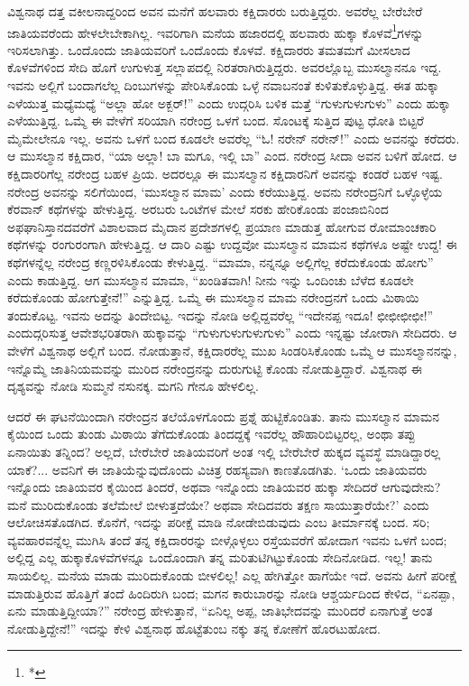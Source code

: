 ವಿಶ್ವನಾಥ ದತ್ತ ವಕೀಲನಾದ್ದರಿಂದ ಅವನ ಮನೆಗೆ ಹಲವಾರು ಕಕ್ಷಿದಾರರು ಬರುತ್ತಿದ್ದರು. ಅವರೆಲ್ಲ ಬೇರೆಬೇರೆ ಜಾತಿಯವರೆಂದು ಹೇಳಲೇಬೇಕಾಗಿಲ್ಲ. ಇವರಿಗಾಗಿ ಮನೆಯ ಹಜಾರದಲ್ಲಿ ಹಲವಾರು ಹುಕ್ಕಾ ಕೊಳವೆ\footnote{*}ಗಳನ್ನು ಇರಿಸಲಾಗಿತ್ತು. ಒಂದೊಂದು ಜಾತಿಯವರಿಗೆ ಒಂದೊಂದು ಕೊಳವೆ. ಕಕ್ಷಿದಾರರು ತಮತಮಗೆ ಮೀಸಲಾದ ಕೊಳವೆಗಳಿಂದ ಸೇದಿ ಹೊಗೆ ಉಗುಳುತ್ತ ಸಲ್ಲಾಪದಲ್ಲಿ ನಿರತರಾಗಿರುತ್ತಿದ್ದರು. ಅವರಲ್ಲೊಬ್ಬ ಮುಸಲ್ಮಾನನೂ ಇದ್ದ. ಇವನು ಅಲ್ಲಿಗೆ ಬಂದಾಗಲೆಲ್ಲ ದಿಂಬುಗಳನ್ನು ಪೇರಿಸಿಕೊಂಡು ಒಳ್ಳೆ ನವಾಬನಂತೆ ಕುಳಿತುಕೊಳ್ಳುತ್ತಿದ್ದ. ಈತ ಹುಕ್ಕಾ ಎಳೆಯುತ್ತ ಮಧ್ಯೆಮಧ್ಯೆ “ಅಲ್ಲಾ ಹೋ ಅಕ್ಬರ್!” ಎಂದು ಉದ್ಗರಿಸಿ ಬಳಿಕ ಮತ್ತೆ “ಗುಳುಗುಳುಗುಳು” ಎಂದು ಹುಕ್ಕಾ ಎಳೆಯುತ್ತಿದ್ದ. ಒಮ್ಮೆ ಈ ವೇಳೆಗೆ ಸರಿಯಾಗಿ ನರೇಂದ್ರ ಒಳಗೆ ಬಂದ. ಸೊಂಟಕ್ಕೆ ಸುತ್ತಿದ ಪುಟ್ಟ ಧೋತಿ ಬಿಟ್ಟರೆ ಮೈಮೇಲೇನೂ ಇಲ್ಲ. ಅವನು ಒಳಗೆ ಬಂದ ಕೂಡಲೇ ಅವರೆಲ್ಲ “ಓ! ನರೇನ್ ನರೇನ್!” ಎಂದು ಅವನನ್ನು ಕರೆದರು. ಆ ಮುಸಲ್ಮಾನ ಕಕ್ಷಿದಾರ, “ಯಾ ಅಲ್ಲಾ! ಬಾ ಮಗೂ, ಇಲ್ಲಿ ಬಾ” ಎಂದ. ನರೇಂದ್ರ ಸೀದಾ ಅವನ ಬಳಿಗೆ ಹೋದ. ಆ ಕಕ್ಷಿದಾರರಿಗೆಲ್ಲ ನರೇಂದ್ರ ಬಹಳ ಪ್ರಿಯ. ಅದರಲ್ಲೂ ಈ ಮುಸಲ್ಮಾನ ಕಕ್ಷಿದಾರನಿಗೆ ಅವನನ್ನು ಕಂಡರೆ ಬಹಳ ಇಷ್ಟ. ನರೇಂದ್ರ ಅವನನ್ನು ಸಲಿಗೆಯಿಂದ, ‘ಮುಸಲ್ಮಾನ ಮಾಮ’ ಎಂದು ಕರೆಯುತ್ತಿದ್ದ. ಅವನು ನರೇಂದ್ರನಿಗೆ ಒಳ್ಳೊಳ್ಳೆಯ ಕೆರವಾನ್ ಕಥೆಗಳನ್ನು ಹೇಳುತ್ತಿದ್ದ. ಅರಬರು ಒಂಟೆಗಳ ಮೇಲೆ ಸರಕು ಹೇರಿಕೊಂಡು ಪಂಜಾಬಿನಿಂದ ಅಫಘಾನಿಸ್ತಾನದವರೆಗೆ ವಿಶಾಲವಾದ ಮೈದಾನ ಪ್ರದೇಶಗಳಲ್ಲಿ ಪ್ರಯಾಣ ಮಾಡುತ್ತ ಹೋಗುವ ರೋಮಾಂಚಕಾರಿ ಕಥೆಗಳನ್ನು ರಂಗುರಂಗಾಗಿ ಹೇಳುತ್ತಿದ್ದ. ಆ ದಾರಿ ಎಷ್ಟು ಉದ್ದವೋ ಮುಸಲ್ಮಾನ ಮಾಮನ ಕಥೆಗಳೂ ಅಷ್ಟೇ ಉದ್ದ! ಈ ಕಥೆಗಳನ್ನೆಲ್ಲ ನರೇಂದ್ರ ಕಣ್ಣರಳಿಸಿಕೊಂಡು ಕೇಳುತ್ತಿದ್ದ. “ಮಾಮಾ, ನನ್ನನ್ನೂ ಅಲ್ಲಿಗೆಲ್ಲ ಕರೆದುಕೊಂಡು ಹೋಗು” ಎಂದು ಕಾಡುತ್ತಿದ್ದ. ಆಗ ಮುಸಲ್ಮಾನ ಮಾಮಾ, “ಖಂಡಿತವಾಗಿ! ನೀನು ಇನ್ನು ಒಂದಿಂಚು ಬೆಳೆದ ಕೂಡಲೇ ಕರೆದುಕೊಂಡು ಹೋಗುತ್ತೇನೆ!” ಎನ್ನುತ್ತಿದ್ದ. ಒಮ್ಮೆ ಈ ಮುಸಲ್ಮಾನ ಮಾಮ ನರೇಂದ್ರನಗೆ ಒಂದು ಮಿಠಾಯಿ ತಂದುಕೊಟ್ಟ. ಇವನು ಅದನ್ನು ತಿಂದೇಬಿಟ್ಟ. ಇದನ್ನು ನೋಡಿ ಅಲ್ಲಿದ್ದವರೆಲ್ಲ “ಇದೇನಪ್ಪ ಇದೂ! ಛೀಛೀಛೀಛೀ!” ಎಂದುದ್ಗರಿಸುತ್ತ ಆವೇಶಭರಿತರಾಗಿ ಹುಕ್ಕಾವನ್ನು “ಗುಳುಗುಳುಗುಳುಗುಳು” ಎಂದು ಇನ್ನಷ್ಟು ಜೋರಾಗಿ ಸೇದಿದರು. ಆ ವೇಳೆಗೆ ವಿಶ್ವನಾಥ ಅಲ್ಲಿಗೆ ಬಂದ. ನೋಡುತ್ತಾನೆ, ಕಕ್ಷಿದಾರರೆಲ್ಲ ಮುಖ ಸಿಂಡರಿಸಿಕೊಂಡು ಒಮ್ಮೆ ಆ ಮುಸಲ್ಮಾನನನ್ನು, ಇನ್ನೊಮ್ಮೆ ಜಾತಿನಿಯಮವನ್ನು ಮುರಿದ ನರೇಂದ್ರನನ್ನು ದುರುಗುಟ್ಟಿ ಕೊಂಡು ನೋಡುತ್ತಿದ್ದಾರೆ. ವಿಶ್ವನಾಥ ಈ ದೃಶ್ಯವನ್ನು ನೋಡಿ ಸುಮ್ಮನೆ ನಸುನಕ್ಕ. ಮಗನಿ ಗೇನೂ ಹೇಳಲಿಲ್ಲ.

ಆದರೆ ಈ ಘಟನೆಯಿಂದಾಗಿ ನರೇಂದ್ರನ ತಲೆಯೊಳಗೊಂದು ಪ್ರಶ್ನೆ ಹುಟ್ಟಿಕೊಂಡಿತು. ತಾನು ಮುಸಲ್ಮಾನ ಮಾಮನ ಕೈಯಿಂದ ಒಂದು ತುಂಡು ಮಿಠಾಯಿ ತೆಗೆದುಕೊಂಡು ತಿಂದದ್ದಕ್ಕೆ ಇವರೆಲ್ಲ ಹೌಹಾರಿಬಿಟ್ಟರಲ್ಲ, ಅಂಥಾ ತಪ್ಪು ಏನಾಯಿತು ತನ್ನಿಂದ? ಅಲ್ಲದೆ, ಬೇರೆಬೇರೆ ಜಾತಿಯವರಿಗೆ ಅಂತ ಇಲ್ಲಿ ಬೇರೆಬೇರೆ ಹುಕ್ಕದ ವ್ಯವಸ್ಥೆ ಮಾಡಿದ್ದಾರಲ್ಲ ಯಾಕೆ?... ಅವನಿಗೆ ಈ ಜಾತಿಯೆನ್ನುವುದೊಂದು ವಿಚಿತ್ರ ರಹಸ್ಯವಾಗಿ ಕಾಣತೊಡಗಿತು. ‘ಒಂದು ಜಾತಿಯವರು ಇನ್ನೊಂದು ಜಾತಿಯವರ ಕೈಯಿಂದ ತಿಂದರೆ, ಅಥವಾ ಇನ್ನೊಂದು ಜಾತಿಯವರ ಹುಕ್ಕಾ ಸೇದಿದರೆ ಆಗುವುದೇನು? ಮನೆ ಮುರಿದುಕೊಂಡು ತಲೆಮೇಲೆ ಬೀಳುತ್ತದೆಯೇ? ಅಥವಾ ಸೇದಿದವರು ತಕ್ಷಣ ಸಾಯುತ್ತಾರೆಯೇ?’ ಎಂದು ಆಲೋಚಿಸತೊಡಗಿದ. ಕೊನೆಗೆ, ಇದನ್ನು ಪರೀಕ್ಷೆ ಮಾಡಿ ನೋಡೇಬಿಡುವುದು ಎಂಬ ತೀರ್ಮಾನಕ್ಕೆ ಬಂದ. ಸರಿ; ವ್ಯವಹಾರವನ್ನೆಲ್ಲ ಮುಗಿಸಿ ತಂದೆ ತನ್ನ ಕಕ್ಷಿದಾರರನ್ನು ಬೀಳ್ಗೊಳ್ಳಲು ರಸ್ತೆಯವರೆಗೆ ಹೋದಾಗ ಇವನು ಒಳಗೆ ಬಂದ; ಅಲ್ಲಿದ್ದ ಎಲ್ಲ ಹುಕ್ಕಾಕೊಳವೆಗಳನ್ನೂ ಒಂದೊಂದಾಗಿ ತನ್ನ ಮರಿತುಟಿಗಿಟ್ಟುಕೊಂಡು ಸೇದಿನೋಡಿದ. ಇಲ್ಲ! ತಾನು ಸಾಯಲಿಲ್ಲ. ಮನೆಯ ಮಾಡು ಮುರಿದುಕೊಂಡು ಬೀಳಲಿಲ್ಲ! ಎಲ್ಲ ಹೇಗಿತ್ತೋ ಹಾಗೆಯೇ ಇದೆ. ಅವನು ಹೀಗೆ ಪರೀಕ್ಷೆ ಮಾಡುತ್ತಿರುವ ಹೊತ್ತಿಗೆ ತಂದೆ ಹಿಂದಿರುಗಿ ಬಂದ; ಮಗನ ಕಾರುಬಾರನ್ನು ನೋಡಿ ಆಶ್ಚರ್ಯದಿಂದ ಕೇಳಿದ, “ಏನಪ್ಪಾ, ಏನು ಮಾಡುತ್ತಿದ್ದೀಯಾ?” ನರೇಂದ್ರ ಹೇಳುತ್ತಾನೆ, “ಏನಿಲ್ಲ ಅಪ್ಪ, ಜಾತಿಭೇದವನ್ನು ಮುರಿದರೆ ಏನಾಗುತ್ತೆ ಅಂತ ನೋಡುತ್ತಿದ್ದೇನೆ!” ಇದನ್ನು ಕೇಳಿ ವಿಶ್ವನಾಥ ಹೊಟ್ಟೆತುಂಬ ನಕ್ಕು ತನ್ನ ಕೋಣೆಗೆ ಹೊರಟುಹೋದ.

